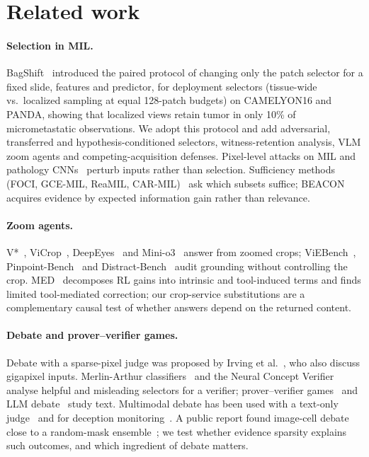 \documentclass[10pt,twocolumn,letterpaper]{article}
\begin{document}
\section{Related work}\label{sec:related}
\paragraph{Selection in MIL.} BagShift~\cite{bagshift2026} introduced the paired protocol of changing only the patch selector for a fixed slide, features and predictor, for deployment selectors (tissue-wide vs.\ localized sampling at equal 128-patch budgets) on CAMELYON16 and PANDA, showing that localized views retain tumor in only 10\% of micrometastatic observations. We adopt this protocol and add adversarial, transferred and hypothesis-conditioned selectors, witness-retention analysis, VLM zoom agents and competing-acquisition defenses. Pixel-level attacks on MIL and pathology CNNs~\cite{mil_adv2022,foote2021now} perturb inputs rather than selection. Sufficiency methods (FOCI, GCE-MIL, ReaMIL, CAR-MIL)~\cite{foci2026,gcemil2026,reamil2026,carmil2026} ask which subsets suffice; BEACON~\cite{beacon2026} acquires evidence by expected information gain rather than relevance.
\paragraph{Zoom agents.} V*~\cite{wu2024vstar}, ViCrop~\cite{zhang2025vicrop}, DeepEyes~\cite{zheng2025deepeyes} and Mini-o3~\cite{minio3} answer from zoomed crops; ViEBench~\cite{viebench2026}, Pinpoint-Bench~\cite{pixeleyes2026} and Distract-Bench~\cite{distract2026} audit grounding without controlling the crop. MED~\cite{med2026} decomposes RL gains into intrinsic and tool-induced terms and finds limited tool-mediated correction; our crop-service substitutions are a complementary causal test of whether answers depend on the returned content.
\paragraph{Debate and prover--verifier games.} Debate with a sparse-pixel judge was proposed by Irving et al.~\cite{irving2018debate}, who also discuss gigapixel inputs. Merlin-Arthur classifiers~\cite{waldchen2024merlin} and the Neural Concept Verifier~\cite{ncv2026} analyse helpful and misleading selectors for a verifier; prover--verifier games~\cite{anil2021pvg,kirchner2024pvg,hammond2025nip} and LLM debate~\cite{khan2024debate,kenton2024scalable} study text. Multimodal debate has been used with a text-only judge~\cite{adhikari2025debating} and for deception monitoring~\cite{fang2026debateimages}. A public report found image-cell debate close to a random-mask ensemble~\cite{quantilized_debate}; we test whether evidence sparsity explains such outcomes, and which ingredient of debate matters.
\end{document}
